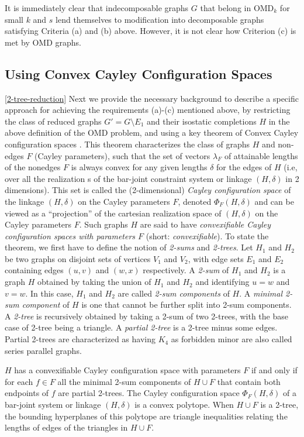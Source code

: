 It is immediately clear that indecomposable graphs $G$ that belong in OMD$_k$ for small $k$ and
$s$  lend themselves to modification  into decomposable graphs
satisfying Criteria (a) and (b) above.
However, it is not clear how Criterion (c) is met by OMD graphs.
%
\subsection{Using Convex Cayley Configuration Spaces}
%
\ref{2-tree-reduction}
Next we provide the necessary background to describe a specific approach for achieving the requirements
(a)-(c) mentioned above, by restricting the class of reduced graphs $G' =
G\setminus E_1$ and their isostatic completions $H$ in the above definition of the
OMD problem, and using a key theorem of Convex Cayley configuration
spaces \cite{XX}. This theorem characterizes the class of graphs $H$ and non-edges $F$ (Cayley
parameters), such that the set of vectors $\lambda_F$ of  attainable lengths of
the nonedges $F$
is always convex for any
given lengths $\delta$ for the edges of $H$ (i.e, over all the realization
s of the bar-joint constraint system or linkage $(H,\delta)$ in 2 dimensions).
This set is called the (2-dimensional) {\em Cayley configuration space}
of the linkage $(H,\delta)$ on the Cayley parameters $F$, denoted
$\Phi_F(H,\delta)$ and can be viewed as a ``projection'' of the cartesian
realization space of $(H,\delta)$ on the Cayley parameters $F$.
Such graphs $H$ are said to have {\em convexifiable Cayley configuration spaces
with parameters $F$} (short: {\em convexifiable}). To state the theorem, we first have to define the
notion of {\em 2-sums} and {\em 2-trees}.
Let $H_1$ and $H_2$ be two graphs on disjoint sets of vertices $V_1$ and
$V_2$, with edge sets $E_1$ and $E_2$ containing edges $(u,v)$ and $(w,x)$
respectively.  A {\em 2-sum} of
$H_1$ and $H_2$ is a
graph $H$  obtained by taking the union of $H_1$ and $H_2$ and identifying $u=w$ and $v=w$.
In this case, $H_1$ and $H_2$ are called {\em 2-sum components} of $H$.
A {\em minimal 2-sum component} of $H$ is  one that cannot be further split
into 2-sum components.
A {\em 2-tree} is recursively obtained by taking
a 2-sum of two 2-trees, with the base case of 2-tree being a triangle.
A {\em partial 2-tree} is a 2-tree minus some edges.
Partial 2-trees are characterized as having $K_4$ as forbidden minor are also called series parallel graphs.

\begin{theorem}
    \label{convexcayley}
    \cite{XX}
    $H$ has a convexifiable Cayley configuration space  with parameters $F$
    if and only if for each $f\in F$  all the minimal 2-sum components
    of $H\cup F$ that contain both endpoints of $f$ are partial 2-trees.
    The Cayley configuration space $\Phi_F(H,\delta)$
    of a bar-joint system or linkage $(H,\delta)$ is a convex polytope.
    When $H\cup F$ is a 2-tree, the
    bounding hyperplanes of this polytope are triangle inequalities
    relating the lengths of edges of the triangles in $H\cup F$.
\end{theorem}

